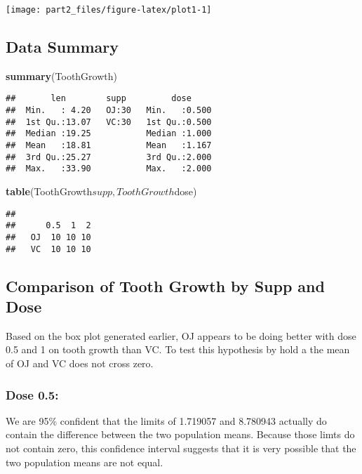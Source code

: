 \documentclass[]{article}
\newenvironment{Shaded}{\begin{snugshade}}{\end{snugshade}}
\newcommand{\KeywordTok}[1]{\textcolor[rgb]{0.13,0.29,0.53}{\textbf{{#1}}}}
\newcommand{\NormalTok}[1]{{#1}}
\begin{document}
\begin{center}\texttt{[image: part2\_files/figure-latex/plot1-1]} \end{center}

\subsection{Data Summary}\label{data-summary}

\begin{Shaded}
\begin{Highlighting}[]
\KeywordTok{summary}\NormalTok{(ToothGrowth)}
\end{Highlighting}
\end{Shaded}

\begin{verbatim}
##       len        supp         dose      
##  Min.   : 4.20   OJ:30   Min.   :0.500  
##  1st Qu.:13.07   VC:30   1st Qu.:0.500  
##  Median :19.25           Median :1.000  
##  Mean   :18.81           Mean   :1.167  
##  3rd Qu.:25.27           3rd Qu.:2.000  
##  Max.   :33.90           Max.   :2.000
\end{verbatim}

\begin{Shaded}
\begin{Highlighting}[]
\KeywordTok{table}\NormalTok{(ToothGrowth$supp,ToothGrowth$dose)}
\end{Highlighting}
\end{Shaded}

\begin{verbatim}
##     
##      0.5  1  2
##   OJ  10 10 10
##   VC  10 10 10
\end{verbatim}

\subsection{Comparison of Tooth Growth by Supp and
Dose}\label{comparison-of-tooth-growth-by-supp-and-dose}

Based on the box plot generated earlier, OJ appears to be doing better
with dose 0.5 and 1 on tooth growth than VC. To test this hypothesis by
hold a the mean of OJ and VC does not cross zero.

\subsubsection{Dose 0.5:}\label{dose-0.5}

We are 95\% confident that the limits of 1.719057 and 8.780943 actually
do contain the difference between the two population means. Because
those limts do not contain zero, this confidence interval suggests that
it is very possible that the two population means are not equal.
\end{document}
